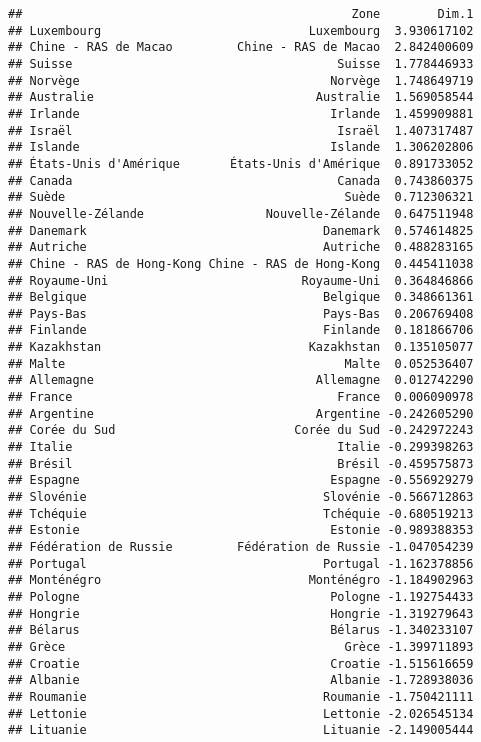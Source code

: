 \documentclass[
]{article}
\begin{document}
\begin{verbatim}
##                                              Zone        Dim.1
## Luxembourg                             Luxembourg  3.930617102
## Chine - RAS de Macao         Chine - RAS de Macao  2.842400609
## Suisse                                     Suisse  1.778446933
## Norvège                                   Norvège  1.748649719
## Australie                               Australie  1.569058544
## Irlande                                   Irlande  1.459909881
## Israël                                     Israël  1.407317487
## Islande                                   Islande  1.306202806
## États-Unis d'Amérique       États-Unis d'Amérique  0.891733052
## Canada                                     Canada  0.743860375
## Suède                                       Suède  0.712306321
## Nouvelle-Zélande                 Nouvelle-Zélande  0.647511948
## Danemark                                 Danemark  0.574614825
## Autriche                                 Autriche  0.488283165
## Chine - RAS de Hong-Kong Chine - RAS de Hong-Kong  0.445411038
## Royaume-Uni                           Royaume-Uni  0.364846866
## Belgique                                 Belgique  0.348661361
## Pays-Bas                                 Pays-Bas  0.206769408
## Finlande                                 Finlande  0.181866706
## Kazakhstan                             Kazakhstan  0.135105077
## Malte                                       Malte  0.052536407
## Allemagne                               Allemagne  0.012742290
## France                                     France  0.006090978
## Argentine                               Argentine -0.242605290
## Corée du Sud                         Corée du Sud -0.242972243
## Italie                                     Italie -0.299398263
## Brésil                                     Brésil -0.459575873
## Espagne                                   Espagne -0.556929279
## Slovénie                                 Slovénie -0.566712863
## Tchéquie                                 Tchéquie -0.680519213
## Estonie                                   Estonie -0.989388353
## Fédération de Russie         Fédération de Russie -1.047054239
## Portugal                                 Portugal -1.162378856
## Monténégro                             Monténégro -1.184902963
## Pologne                                   Pologne -1.192754433
## Hongrie                                   Hongrie -1.319279643
## Bélarus                                   Bélarus -1.340233107
## Grèce                                       Grèce -1.399711893
## Croatie                                   Croatie -1.515616659
## Albanie                                   Albanie -1.728938036
## Roumanie                                 Roumanie -1.750421111
## Lettonie                                 Lettonie -2.026545134
## Lituanie                                 Lituanie -2.149005444
\end{verbatim}
\end{document}
